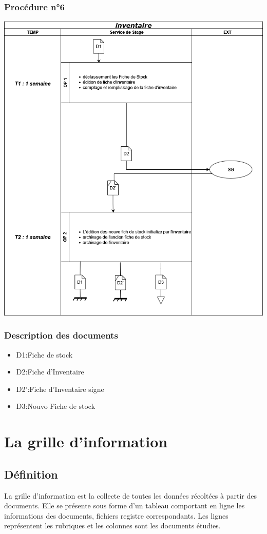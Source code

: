 \subsubsection*{Procédure n°6}
\includegraphics[width=1\textwidth]{chapter/Study of the Existing/EP/inventaire.png}
\subsubsection*{Description des documents}
\begin{itemize}
    \item D1:Fiche de stock
    \item D2:Fiche d'Inventaire
    \item D2':Fiche d'Inventaire signe
    \item D3:Nouvo Fiche de stock
\end{itemize}

\section{La grille d’information}
\subsection{Définition}
La grille d'information est la collecte de toutes les données récoltées à partir
des documents.
Elle se présente sous forme d'un tableau comportant en ligne les informations
des documents, fichiers registre correspondants.
Les lignes représentent les rubriques et les colonnes sont les documents
étudies.
